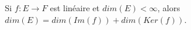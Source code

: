 Si $f : E \to F$ est linéaire et $dim(E)<\infty$, alors $dim(E)=dim(Im(f))+dim(Ker(f))$.

\begin{reponses}
\end{reponses}

